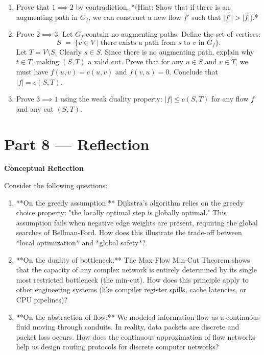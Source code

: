 \documentclass[12pt, a4paper]{book}
\begin{document}
\begin{deepbox}
\begin{enumerate}[label=\textbf{D\arabic*.}]
        \begin{enumerate}[label=(\alph*)]
          \item Prove that $1 \implies 2$ by contradiction.
                *(Hint: Show that if there is an augmenting path in $G_f$, we can construct a new flow $f'$ such that $|f'| > |f|$).*
          \item Prove $2 \implies 3$. Let $G_f$ contain no augmenting paths.
                Define the set of vertices:
                \[
                  S \;=\; \{ v \in V \mid \text{there exists a path from } s \text{ to } v \text{ in } G_f \}.
                \]
                Let $T = V \setminus S$.
                Clearly $s \in S$. Since there is no augmenting path, explain why $t \in T$, making $(S, T)$ a valid cut.
                Prove that for any $u \in S$ and $v \in T$, we must have $f(u, v) = c(u, v)$ and $f(v, u) = 0$.
                Conclude that $|f| = c(S, T)$.
          \item Prove $3 \implies 1$ using the weak duality property: $|f| \le c(S, T)$ for any flow $f$ and any cut $(S, T)$.
        \end{enumerate}
\end{enumerate}
\end{deepbox}

\newpage

\section{Part 8 --- Reflection}

\begin{reflectionbox}
\textbf{Conceptual Reflection}

Consider the following questions:
\begin{enumerate}
  \item **On the greedy assumption:** Dijkstra's algorithm relies on the greedy choice property: "the locally optimal step is globally optimal." This assumption fails when negative edge weights are present, requiring the global searches of Bellman-Ford. How does this illustrate the trade-off between *local optimization* and *global safety*?
  \item **On the duality of bottleneck:** The Max-Flow Min-Cut Theorem shows that the capacity of any complex network is entirely determined by its single most restricted bottleneck (the min-cut). How does this principle apply to other engineering systems (like compiler register spills, cache latencies, or CPU pipelines)?
  \item **On the abstraction of flow:** We modeled information flow as a continuous fluid moving through conduits. In reality, data packets are discrete and packet loss occurs. How does the continuous approximation of flow networks help us design routing protocols for discrete computer networks?
\end{enumerate}
\end{reflectionbox}
\end{document}
